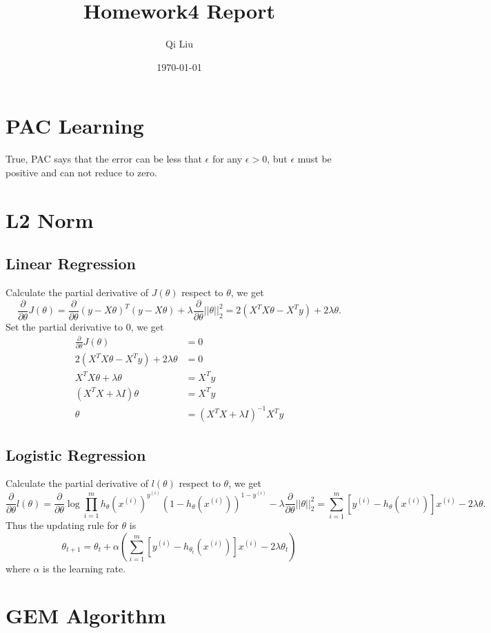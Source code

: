 \documentclass{article}
\title{Homework4 Report}
\author{Qi Liu}
\date{\today}
\begin{document}
\maketitle

\section{PAC Learning}
True, PAC says that the error can be less that $\epsilon$ for any $\epsilon>0$, but $\epsilon$ must be positive and can not reduce to zero.

\section{L2 Norm}

\subsection{Linear Regression}
Calculate the partial derivative of $J(\theta)$ respect to $\theta$, we get
$$\frac{\partial}{\partial\theta}J(\theta)= \frac{\partial}{\partial\theta}(y-X\theta)^T(y-X\theta)+ \lambda\frac{\partial}{\partial\theta}||\theta||^2_2= 2(X^TX\theta-X^Ty)+2\lambda\theta.$$ Set the partial derivative to 0, we get 
\begin{align*}
\frac{\partial}{\partial\theta}J(\theta)&=0 \\
2(X^TX\theta-X^Ty)+2\lambda\theta&=0 \\
X^TX\theta+\lambda\theta&=X^Ty \\
(X^TX+\lambda I)\theta&=X^Ty \\
\theta&=(X^TX+\lambda I)^{-1}X^Ty
\end{align*}

\subsection{Logistic Regression}
Calculate the partial derivative of $l(\theta)$ respect to $\theta$, we get
$$\frac{\partial}{\partial\theta}l(\theta)=\frac{\partial}{\partial\theta} \log\prod_{i=1}^mh_\theta(x^{(i)})^{y^{(i)}}(1-h_\theta(x^{(i)}))^{1-y^{(i)}}- \lambda\frac{\partial}{\partial\theta}||\theta||^2_2=\sum_{i=1}^m[y^{(i)}- h_\theta(x^{(i)})]x^{(i)}-2\lambda\theta.$$ Thus the updating rule for $\theta$ is $$\theta_{t+1}=\theta_{t}+\alpha(\sum_{i=1}^m[y^{(i)}- h_{\theta_t}(x^{(i)})]x^{(i)}-2\lambda\theta_t)$$ where $\alpha$ is the learning rate.

\section{GEM Algorithm}
\end{document}
